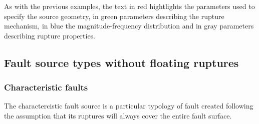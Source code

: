 As with the previous examples, the text in red hightlights the parameters
used to specify the source geometry, in green parameters describing the 
rupture mechanism, in blue the magnitude-frequency distribution and in 
gray parameters describing rupture properties. 
%
\subsection{Fault source types without floating ruptures}
\subsubsection{Characteristic faults}
The charactercistic fault source is a particular typology of fault
created following the assumption that its ruptures will always cover 
the entire fault surface. 


